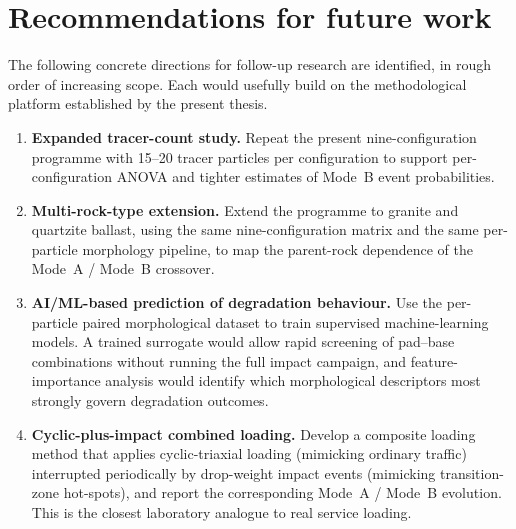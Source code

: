 \section{Recommendations for future work}
\label{sec:recommendations}

The following concrete directions for follow-up research are identified, in rough order of increasing scope. Each would usefully build on the methodological platform established by the present thesis.
\begin{enumerate}[label=\arabic*.,leftmargin=2.2em]
  \item \textbf{Expanded tracer-count study.} Repeat the present nine-configuration programme with 15--20 tracer particles per configuration to support per-configuration ANOVA and tighter estimates of Mode~B event probabilities.
  \item \textbf{Multi-rock-type extension.} Extend the programme to granite and quartzite ballast, using the same nine-configuration matrix and the same per-particle morphology pipeline, to map the parent-rock dependence of the Mode~A / Mode~B crossover.
  \item \textbf{AI/ML-based prediction of degradation behaviour.} Use the per-particle paired morphological dataset to train supervised machine-learning models. A trained surrogate would allow rapid screening of pad--base combinations without running the full impact campaign, and feature-importance analysis would identify which morphological descriptors most strongly govern degradation outcomes.
  \item \textbf{Cyclic-plus-impact combined loading.} Develop a composite loading method that applies cyclic-triaxial loading (mimicking ordinary traffic) interrupted periodically by drop-weight impact events (mimicking transition-zone hot-spots), and report the corresponding Mode~A / Mode~B evolution. This is the closest laboratory analogue to real service loading.
\end{enumerate}

